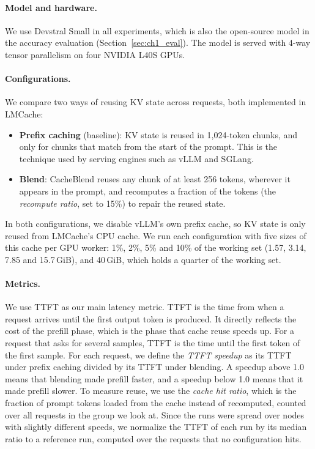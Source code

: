 \paragraph{Model and hardware.}
We use Devstral Small in all experiments, which is also the open-source model in the accuracy evaluation (Section~\ref{sec:ch1_eval}). The model is served with 4-way tensor parallelism on four NVIDIA L40S GPUs.

\paragraph{Configurations.}
We compare two ways of reusing KV state across requests, both implemented in LMCache:
\begin{itemize}
    \item \textbf{Prefix caching} (baseline): KV state is reused in 1{,}024-token chunks, and only for chunks that match from the start of the prompt. This is the technique used by serving engines such as vLLM and SGLang.
    \item \textbf{Blend}: CacheBlend reuses any chunk of at least 256 tokens, wherever it appears in the prompt, and recomputes a fraction of the tokens (the \emph{recompute ratio}, set to 15\%) to repair the reused state.
\end{itemize}
In both configurations, we disable vLLM's own prefix cache, so KV state is only reused from LMCache's CPU cache. We run each configuration with five sizes of this cache per GPU worker: 1\%, 2\%, 5\% and 10\% of the working set (1.57, 3.14, 7.85 and 15.7\,GiB), and 40\,GiB, which holds a quarter of the working set.

\paragraph{Metrics.}
We use TTFT as our main latency metric. TTFT is the time from when a request arrives until the first output token is produced. It directly reflects the cost of the prefill phase, which is the phase that cache reuse speeds up. For a request that asks for several samples, TTFT is the time until the first token of the first sample. For each request, we define the \emph{TTFT speedup} as its TTFT under prefix caching divided by its TTFT under blending. A speedup above 1.0 means that blending made prefill faster, and a speedup below 1.0 means that it made prefill slower. To measure reuse, we use the \emph{cache hit ratio}, which is the fraction of prompt tokens loaded from the cache instead of recomputed, counted over all requests in the group we look at. Since the runs were spread over nodes with slightly different speeds, we normalize the TTFT of each run by its median ratio to a reference run, computed over the requests that no configuration hits.

